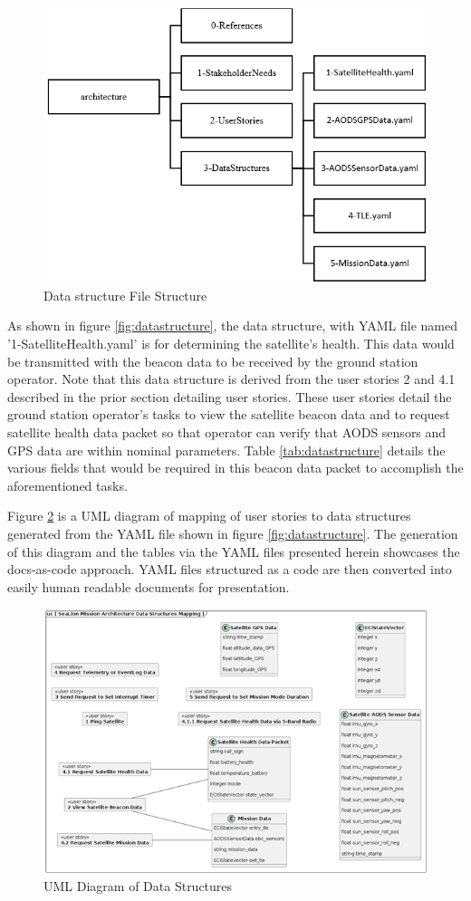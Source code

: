 \documentclass[journal,article,submit,pdftex,moreauthors]{Definitions/mdpi}
\begin{document}
\begin{figure}[H]
    \includegraphics[width=10.5 cm]{assets/datastructure_file.png}
    \caption{Data structure File Structure}
	\label{fig:datastructure_file}
    \end{figure}
	\noindent   
\unskip

As shown in figure \ref{fig:datastructure}, the data structure, with YAML file named '1-SatelliteHealth.yaml' is for determining the satellite's health.  This data would be transmitted with the beacon data to be received by the ground station operator.  Note that this data structure is derived from the user stories 2 and 4.1 described in the prior section detailing user stories.  These user stories detail the ground station operator's tasks to view the satellite beacon data and to request satellite health data packet so that operator can verify that AODS sensors and GPS data are within nominal parameters.  Table \ref{tab:datastructure} details the various fields that would be required in this beacon data packet to accomplish the aforementioned tasks.

Figure \ref{fig:uml_datastructure} is a UML diagram of mapping of user stories to data structures generated from the YAML file shown in figure \ref{fig:datastructure}.  The generation of this diagram and the tables via the YAML files presented herein showcases the docs-as-code approach.  YAML files structured as a code are then converted into easily human readable documents for presentation.

\begin{figure}[H]
    \includegraphics[width=10.5 cm]{assets/uml_datastructure.png}
    \caption{UML Diagram of Data Structures}
	\label{fig:uml_datastructure}
    \end{figure}   
\unskip
\end{document}
